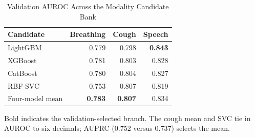 \begin{table}[!t]
\caption{Validation AUROC Across the Modality Candidate Bank}
\label{tab:model-bank}
\centering
\footnotesize
\setlength{\tabcolsep}{5.0pt}
\begin{tabular}{lrrr}
\toprule
Candidate & Breathing & Cough & Speech \\
\midrule
LightGBM & 0.779 & 0.798 & \textbf{0.843} \\
XGBoost & 0.781 & 0.803 & 0.828 \\
CatBoost & 0.780 & 0.804 & 0.827 \\
RBF-SVC & 0.753 & 0.807 & 0.819 \\
Four-model mean & \textbf{0.783} & \textbf{0.807} & 0.834 \\
\bottomrule
\end{tabular}
\par\vspace{1pt}\scriptsize Bold indicates the validation-selected branch. The cough mean and SVC tie in AUROC to six decimals; AUPRC (0.752 versus 0.737) selects the mean.
\end{table}
